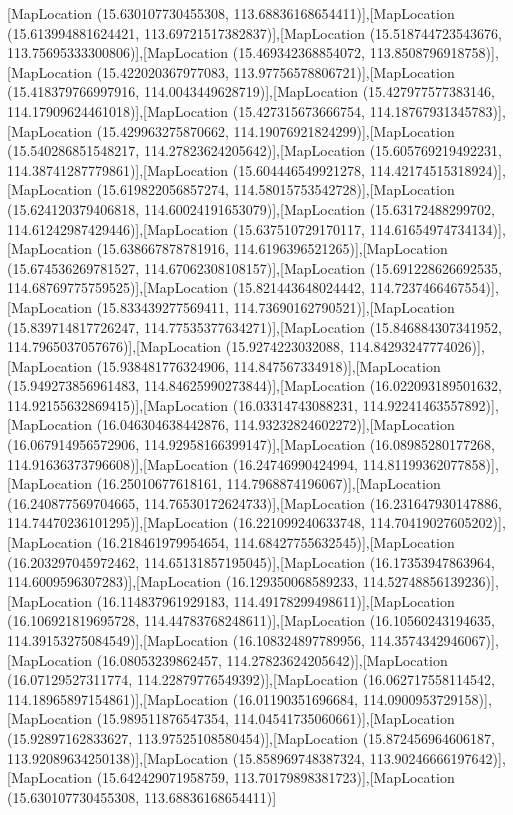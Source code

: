 [MapLocation (15.630107730455308, 113.68836168654411)],[MapLocation (15.613994881624421, 113.69721517382837)],[MapLocation (15.518744723543676, 113.75695333300806)],[MapLocation (15.469342368854072, 113.8508796918758)],[MapLocation (15.422020367977083, 113.97756578806721)],[MapLocation (15.418379766997916, 114.0043449628719)],[MapLocation (15.427977577383146, 114.17909624461018)],[MapLocation (15.427315673666754, 114.18767931345783)],[MapLocation (15.429963275870662, 114.19076921824299)],[MapLocation (15.540286851548217, 114.27823624205642)],[MapLocation (15.605769219492231, 114.38741287779861)],[MapLocation (15.604446549921278, 114.42174515318924)],[MapLocation (15.619822056857274, 114.58015753542728)],[MapLocation (15.624120379406818, 114.60024191653079)],[MapLocation (15.63172488299702, 114.61242987429446)],[MapLocation (15.637510729170117, 114.61654974734134)],[MapLocation (15.638667878781916, 114.6196396521265)],[MapLocation (15.674536269781527, 114.67062308108157)],[MapLocation (15.691228626692535, 114.68769775759525)],[MapLocation (15.821443648024442, 114.7237466467554)],[MapLocation (15.833439277569411, 114.73690162790521)],[MapLocation (15.839714817726247, 114.77535377634271)],[MapLocation (15.846884307341952, 114.7965037057676)],[MapLocation (15.9274223032088, 114.84293247774026)],[MapLocation (15.938481776324906, 114.847567334918)],[MapLocation (15.949273856961483, 114.84625990273844)],[MapLocation (16.022093189501632, 114.92155632869415)],[MapLocation (16.03314743088231, 114.92241463557892)],[MapLocation (16.046304638442876, 114.93232824602272)],[MapLocation (16.067914956572906, 114.92958166399147)],[MapLocation (16.08985280177268, 114.91636373796608)],[MapLocation (16.24746990424994, 114.81199362077858)],[MapLocation (16.25010677618161, 114.7968874196067)],[MapLocation (16.240877569704665, 114.76530172624733)],[MapLocation (16.231647930147886, 114.74470236101295)],[MapLocation (16.221099240633748, 114.70419027605202)],[MapLocation (16.218461979954654, 114.68427755632545)],[MapLocation (16.203297045972462, 114.65131857195045)],[MapLocation (16.17353947863964, 114.6009596307283)],[MapLocation (16.129350068589233, 114.52748856139236)],[MapLocation (16.114837961929183, 114.49178299498611)],[MapLocation (16.106921819695728, 114.44783768248611)],[MapLocation (16.10560243194635, 114.39153275084549)],[MapLocation (16.108324897789956, 114.3574342946067)],[MapLocation (16.08053239862457, 114.27823624205642)],[MapLocation (16.07129527311774, 114.22879776549392)],[MapLocation (16.062717558114542, 114.18965897154861)],[MapLocation (16.01190351696684, 114.0900953729158)],[MapLocation (15.989511876547354, 114.04541735060661)],[MapLocation (15.92897162833627, 113.97525108580454)],[MapLocation (15.872456964606187, 113.92089634250138)],[MapLocation (15.858969748387324, 113.90246666197642)],[MapLocation (15.642429071958759, 113.70179898381723)],[MapLocation (15.630107730455308, 113.68836168654411)]